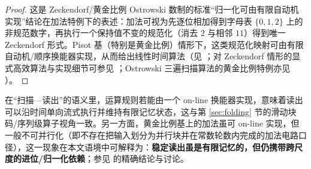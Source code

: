 \begin{proof}
这是 Zeckendorf/黄金比例 Ostrowski 数制的标准“归一化可由有限自动机实现”结论在加法特例下的表述：加法可视为先逐位相加得到字母表 $\{0,1,2\}$ 上的非规范数字，再执行一个保持值不变的规范化（消去 $2$ 与相邻 $11$）得到唯一 Zeckendorf 形式。Pisot 基（特别是黄金比例）情形下，这类规范化映射可由有限自动机/顺序换能器实现，从而给出线性时间算法（见 \cite{Frougny1992NumbersAutomata,Frougny1999OnlineAddition}；对 Zeckendorf 情形的显式高效算法与实现细节可参见 \cite{AhlbachUsatineFrougnyPippenger2013}；Ostrowski 三遍扫描算法的黄金比例特例亦见 \cite{HieronymiTerry2018OstrowskiAddition}）。
\end{proof}

\begin{remark}\label{rem:online-not-parallel}
在“扫描—读出”的语义里，运算规则若能由一个 on-line 换能器实现，意味着读出可以沿时间单向流式执行并维持有限记忆状态，这与第 \ref{sec:folding} 节的滑动块码/序列级算子视角一致。另一方面，黄金比例基上的加法虽可 on-line 实现，但一般不可并行化（即不存在把输入划分为并行块并在常数轮数内完成的加法电路口径），这一现象在本文语境中可解释为：\textbf{稳定读出虽是有限记忆的，但仍携带跨尺度的进位/归一化依赖}；参见 \cite{Frougny1999OnlineAddition} 的精确结论与讨论。
\end{remark}
